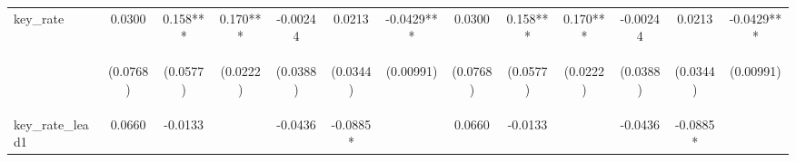 \documentclass[]{article}
\begin{document}
\begin{center}
\begin{tabular}{lcccccccccccc}
key\_rate & 0.0300 & 0.158*** & 0.170*** & -0.00244 & 0.0213 & -0.0429*** & 0.0300 & 0.158*** & 0.170*** & -0.00244 & 0.0213 & -0.0429*** \\
\vspace{4pt} & \begin{footnotesize}(0.0768)\end{footnotesize} & \begin{footnotesize}(0.0577)\end{footnotesize} & \begin{footnotesize}(0.0222)\end{footnotesize} & \begin{footnotesize}(0.0388)\end{footnotesize} & \begin{footnotesize}(0.0344)\end{footnotesize} & \begin{footnotesize}(0.00991)\end{footnotesize} & \begin{footnotesize}(0.0768)\end{footnotesize} & \begin{footnotesize}(0.0577)\end{footnotesize} & \begin{footnotesize}(0.0222)\end{footnotesize} & \begin{footnotesize}(0.0388)\end{footnotesize} & \begin{footnotesize}(0.0344)\end{footnotesize} & \begin{footnotesize}(0.00991)\end{footnotesize} \\
key\_rate\_lead1 & 0.0660 & -0.0133 &  & -0.0436 & -0.0885* &  & 0.0660 & -0.0133 &  & -0.0436 & -0.0885* &  \\

\end{tabular}
\end{center}
\end{document}
